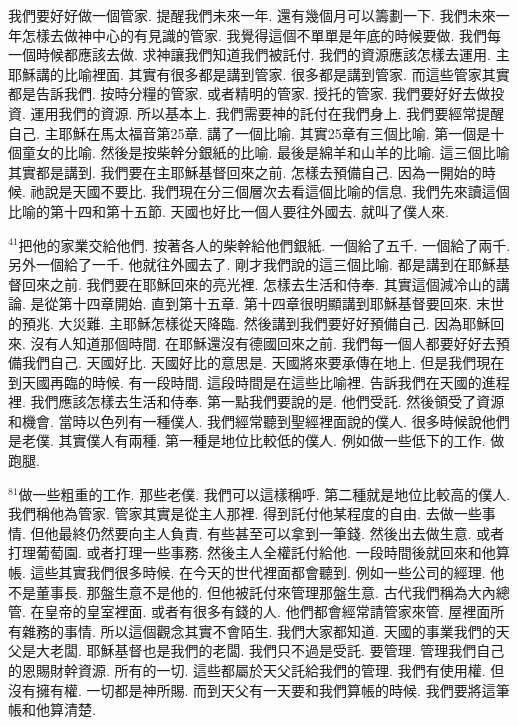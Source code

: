 \documentclass{book}
\begin{document}
我們要好好做一個管家.
提醒我們未來一年.
還有幾個月可以籌劃一下.
我們未來一年怎樣去做神中心的有見識的管家.
我覺得這個不單單是年底的時候要做.
我們每一個時候都應該去做.
求神讓我們知道我們被託付.
我們的資源應該怎樣去運用.
主耶穌講的比喻裡面.
其實有很多都是講到管家.
很多都是講到管家.
而這些管家其實都是告訴我們.
按時分糧的管家.
或者精明的管家.
授托的管家.
我們要好好去做投資.
運用我們的資源.
所以基本上.
我們需要神的託付在我們身上.
我們要經常提醒自己.
主耶穌在馬太福音第25章.
講了一個比喻.
其實25章有三個比喻.
第一個是十個童女的比喻.
然後是按柴幹分銀紙的比喻.
最後是綿羊和山羊的比喻.
這三個比喻其實都是講到.
我們要在主耶穌基督回來之前.
怎樣去預備自己.
因為一開始的時候.
祂說是天國不要比.
我們現在分三個層次去看這個比喻的信息.
我們先來讀這個比喻的第十四和第十五節.
天國也好比一個人要往外國去.
就叫了僕人來.

$^{41}$把他的家業交給他們.
按著各人的柴幹給他們銀紙.
一個給了五千.
一個給了兩千.
另外一個給了一千.
他就往外國去了.
剛才我們說的這三個比喻.
都是講到在耶穌基督回來之前.
我們要在耶穌回來的亮光裡.
怎樣去生活和侍奉.
其實這個減冷山的講論.
是從第十四章開始.
直到第十五章.
第十四章很明顯講到耶穌基督要回來.
末世的預兆.
大災難.
主耶穌怎樣從天降臨.
然後講到我們要好好預備自己.
因為耶穌回來.
沒有人知道那個時間.
在耶穌還沒有德國回來之前.
我們每一個人都要好好去預備我們自己.
天國好比.
天國好比的意思是.
天國將來要承傳在地上.
但是我們現在到天國再臨的時候.
有一段時間.
這段時間是在這些比喻裡.
告訴我們在天國的進程裡.
我們應該怎樣去生活和侍奉.
第一點我們要說的是.
他們受託.
然後領受了資源和機會.
當時以色列有一種僕人.
我們經常聽到聖經裡面說的僕人.
很多時候說他們是老僕.
其實僕人有兩種.
第一種是地位比較低的僕人.
例如做一些低下的工作.
做跑腿.

$^{81}$做一些粗重的工作.
那些老僕.
我們可以這樣稱呼.
第二種就是地位比較高的僕人.
我們稱他為管家.
管家其實是從主人那裡.
得到託付他某程度的自由.
去做一些事情.
但他最終仍然要向主人負責.
有些甚至可以拿到一筆錢.
然後出去做生意.
或者打理葡萄園.
或者打理一些事務.
然後主人全權託付給他.
一段時間後就回來和他算帳.
這些其實我們很多時候.
在今天的世代裡面都會聽到.
例如一些公司的經理.
他不是董事長.
那盤生意不是他的.
但他被託付來管理那盤生意.
古代我們稱為大內總管.
在皇帝的皇室裡面.
或者有很多有錢的人.
他們都會經常請管家來管.
屋裡面所有雜務的事情.
所以這個觀念其實不會陌生.
我們大家都知道.
天國的事業我們的天父是大老闆.
耶穌基督也是我們的老闆.
我們只不過是受託.
要管理.
管理我們自己的恩賜財幹資源.
所有的一切.
這些都屬於天父託給我們的管理.
我們有使用權.
但沒有擁有權.
一切都是神所賜.
而到天父有一天要和我們算帳的時候.
我們要將這筆帳和他算清楚.
\end{document}
